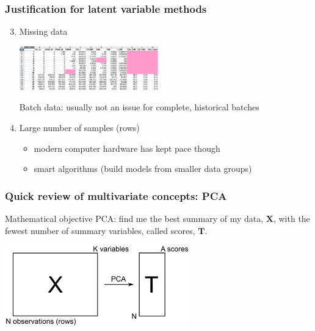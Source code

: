 \begin{frame}\frametitle{Justification for latent variable methods}

\begin{enumerate}
	\setcounter{enumi}{2}
	\item	Missing data
	
			\begin{center}
				\includegraphics[width=6cm]{images/missing-data.png}
			\end{center}
			
			Batch data: usually not an issue for complete, historical batches			
			
	
	\item	Large number of samples (rows)
	
			\begin{itemize}
				\item	modern computer hardware has kept pace though
				
				\item	smart algorithms (build models from smaller data groups)
			\end{itemize} 
\end{enumerate}
\end{frame}

\begin{frame}\frametitle{Quick review of multivariate concepts: PCA}

	\begin{block}{Mathematical objective}
		PCA: find me the best summary of my data, \( \mathbf{X} \), with the fewest number of summary variables, called scores, \( \mathbf{T} \).
	\end{block}
	
	\vspace{18pt}

	\begin{center}
		\includegraphics[width=8cm]{images/reduce-data-X-to-scores-T.png}
	\end{center}
	
\end{frame}

